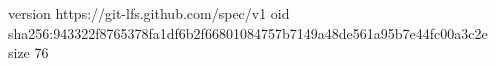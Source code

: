 version https://git-lfs.github.com/spec/v1
oid sha256:943322f8765378fa1df6b2f66801084757b7149a48de561a95b7e44fc00a3c2e
size 76
